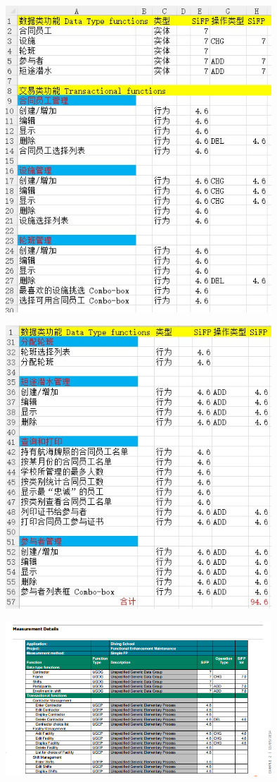 \includegraphics[width=10cm]{Ex2XlsScreenshot20220405143941.jpg}


\includegraphics[width=10cm]{Ex2XlsPt2of2Screenshot20220405143941.jpg}


\includegraphics[width=10cm]{微信截图20210412093632.png}

